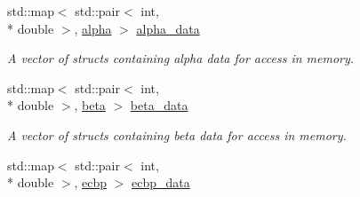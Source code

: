 \begin{DoxyCompactItemize}
\item 
\hypertarget{namespacepyne_a535b6ec192f55087092c07ee478bc11d}{std\+::map$<$ std\+::pair$<$ int, \\*
double $>$, \hyperlink{structpyne_1_1alpha}{alpha} $>$ \hyperlink{namespacepyne_a535b6ec192f55087092c07ee478bc11d}{alpha\+\_\+data}}\label{namespacepyne_a535b6ec192f55087092c07ee478bc11d}

\begin{DoxyCompactList}\small\item\em A vector of structs containing alpha data for access in memory. \end{DoxyCompactList}\item 
\hypertarget{namespacepyne_a5a5d547521d918978adccc01a8cdd10c}{std\+::map$<$ std\+::pair$<$ int, \\*
double $>$, \hyperlink{structpyne_1_1beta}{beta} $>$ \hyperlink{namespacepyne_a5a5d547521d918978adccc01a8cdd10c}{beta\+\_\+data}}\label{namespacepyne_a5a5d547521d918978adccc01a8cdd10c}

\begin{DoxyCompactList}\small\item\em A vector of structs containing beta data for access in memory. \end{DoxyCompactList}\item 
\hypertarget{namespacepyne_a43b4b8a8b73a5e966a55e14a270e98bf}{std\+::map$<$ std\+::pair$<$ int, \\*
double $>$, \hyperlink{structpyne_1_1ecbp}{ecbp} $>$ \hyperlink{namespacepyne_a43b4b8a8b73a5e966a55e14a270e98bf}{ecbp\+\_\+data}}\label{namespacepyne_a43b4b8a8b73a5e966a55e14a270e98bf}


\end{DoxyCompactItemize}
